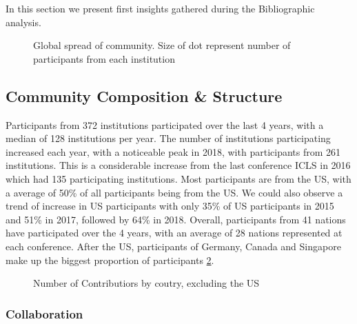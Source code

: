 \documentclass[article,twocolumn]{IEEEtran}
\begin{document}
In this section we present first insights gathered during the
Bibliographic analysis.



    \begin{figure}
        \begin{center}\end{center}
        \caption{Global spread of community. Size of dot represent number of participants from each institution}
        \label{global_com}
    \end{figure}
    
    \hypertarget{community-composition-structure}{%
\subsection{Community Composition \&
Structure}\label{community-composition-structure}}

Participants from 372 institutions participated over the last 4 years,
with a median of 128 institutions per year. The number of institutions
participating increased each year, with a noticeable peak in 2018, with
participants from 261 institutions. This is a considerable increase from
the last conference ICLS in 2016 which had 135 participating
institutions. Most participants are from the US, with a average of 50\%
of all participants being from the US. We could also observe a trend of
increase in US participants with only 35\% of US participants in 2015
and 51\% in 2017, followed by 64\% in 2018. Overall, participants from
41 nations have participated over the 4 years, with an average of 28
nations represented at each conference. After the US, participants of
Germany, Canada and Singapore make up the biggest proportion of
participants \ref{figrep}.


    \begin{figure}
        \begin{center}\end{center}
        \caption{Number of Contributiors by coutry, excluding the US}
        \label{figrep}
    \end{figure}
    
    \hypertarget{collaboration}{%
\subsubsection{Collaboration}\label{collaboration}}
\end{document}

